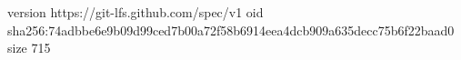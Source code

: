 version https://git-lfs.github.com/spec/v1
oid sha256:74adbbe6e9b09d99ced7b00a72f58b6914eea4dcb909a635decc75b6f22baad0
size 715
